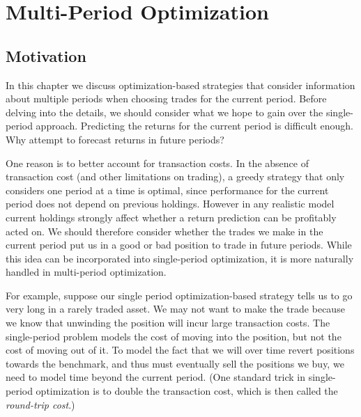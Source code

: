\documentclass[openany]{article}  %
\begin{document}
\chapter{Multi-Period Optimization}
\label{s-mpo}
\section{Motivation}
In this chapter we discuss optimization-based strategies that consider
information about multiple periods when choosing trades for the current period.
Before delving into the details, we should consider what we hope to gain
over the single-period approach.
Predicting the returns for the current period is difficult enough.
Why attempt to forecast returns in future periods?

One reason is to better account for transaction costs.
In the absence of transaction cost (and other limitations on trading),
a greedy strategy that only considers one period at a time is optimal,
since performance for the current period does not depend on previous holdings.
However in any realistic model current holdings strongly affect
whether a return prediction can be profitably acted on.
We should therefore consider whether the trades we make in the current period
put us in a good or bad position to trade in future periods.
While this idea can be incorporated into single-period optimization,
it is more naturally handled in multi-period optimization.

For example, suppose our single period optimization-based strategy tells us to
go very long in a rarely traded asset.
We may not want to make the trade because we know that unwinding the position
will incur large transaction costs.
The single-period problem models the cost of moving into the position,
but not the cost of moving out of it.
To model the fact that we will over time revert positions towards the benchmark,
and thus must eventually sell the positions we buy,
we need to model time beyond the current period.
(One standard trick in single-period optimization is to
double the transaction cost, which is then called the
\emph{round-trip cost}.)
\end{document}

